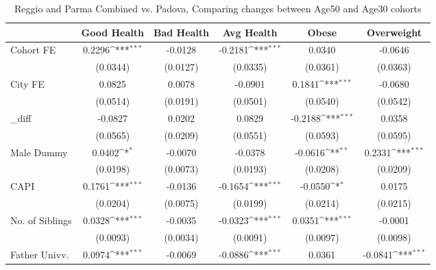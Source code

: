 \begin{table}[htbp]\centering
\def\sym#1{\ifmmode^{#1}\else\(^{#1}\)\fi}
\caption{Reggio and Parma Combined vs. Padova, Comparing changes between Age50 and Age30 cohorts}
\begin{tabular}{l*{5}{c}}
\toprule
            &\multicolumn{1}{c}{Good Health}&\multicolumn{1}{c}{Bad Health}&\multicolumn{1}{c}{Avg Health}&\multicolumn{1}{c}{Obese}&\multicolumn{1}{c}{Overweight}\\
\midrule
Cohort FE   &      0.2296\sym{***}&     -0.0128         &     -0.2181\sym{***}&      0.0340         &     -0.0646         \\
            &    (0.0344)         &    (0.0127)         &    (0.0335)         &    (0.0361)         &    (0.0363)         \\
\addlinespace
City FE     &      0.0825         &      0.0078         &     -0.0901         &      0.1841\sym{***}&     -0.0680         \\
            &    (0.0514)         &    (0.0191)         &    (0.0501)         &    (0.0540)         &    (0.0542)         \\
\addlinespace
\_diff       &     -0.0827         &      0.0202         &      0.0829         &     -0.2188\sym{***}&      0.0358         \\
            &    (0.0565)         &    (0.0209)         &    (0.0551)         &    (0.0593)         &    (0.0595)         \\
\addlinespace
Male Dummy  &      0.0402\sym{*}  &     -0.0070         &     -0.0378         &     -0.0616\sym{**} &      0.2331\sym{***}\\
            &    (0.0198)         &    (0.0073)         &    (0.0193)         &    (0.0208)         &    (0.0209)         \\
\addlinespace
CAPI        &      0.1761\sym{***}&     -0.0136         &     -0.1654\sym{***}&     -0.0550\sym{*}  &      0.0175         \\
            &    (0.0204)         &    (0.0075)         &    (0.0199)         &    (0.0214)         &    (0.0215)         \\
\addlinespace
No. of Siblings&      0.0328\sym{***}&     -0.0035         &     -0.0323\sym{***}&      0.0351\sym{***}&     -0.0001         \\
            &    (0.0093)         &    (0.0034)         &    (0.0091)         &    (0.0097)         &    (0.0098)         \\
\addlinespace
Father Univv.&      0.0974\sym{***}&     -0.0069         &     -0.0886\sym{***}&      0.0361         &     -0.0841\sym{***}\\

\end{tabular}
\end{table}
